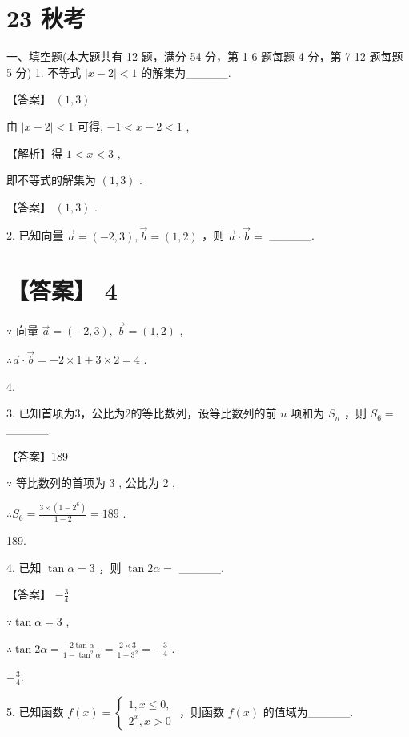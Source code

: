 \documentclass[10pt]{article}
\begin{document}
\section*{23 秋考}

一、填空题(本大题共有 12 题，满分 54 分，第 1-6 题每题 4 分，第 7-12 题每题 5 分) 1. 不等式 \(\left| {x - 2}\right|  < 1\) 的解集为\_\_\_\_\_.

【答案】 \(\left( {1,3}\right)\)

由 \(\left| {x - 2}\right|  < 1\) 可得, \(- 1 < x - 2 < 1\) ,

【解析】得 \(1 < x < 3\) ,

即不等式的解集为 \(\left( {1,3}\right)\) .

【答案】 \(\left( {1,3}\right)\) .

2. 已知向量 \(\overrightarrow{a} = \left( {-2,3}\right) ,\overrightarrow{b} = \left( {1,2}\right)\) ，则 \(\overrightarrow{a} \cdot  \overrightarrow{b} =\) \_\_\_\_\_.

\section*{【答案】 4}

\(\because\) 向量 \(\overrightarrow{a} = \left( {-2,3}\right) ,\;\overrightarrow{b} = \left( {1,2}\right)\) ,

\(\therefore \overrightarrow{a} \cdot  \overrightarrow{b} =  - 2 \times  1 + 3 \times  2 = 4\) .

4.

3. 已知首项为3，公比为2的等比数列，设等比数列的前 \(n\) 项和为 \({S}_{n}\) ，则 \({S}_{6} =\) \_\_\_\_\_.

【答案】189

\(\because\) 等比数列的首项为 3 , 公比为 2 ,

\(\therefore {S}_{6} = \frac{3 \times  \left( {1 - {2}^{6}}\right) }{1 - 2} = {189}\) .

189.

4. 已知 \(\tan \alpha  = 3\) ，则 \(\tan {2\alpha } =\) \_\_\_\_\_.

【答案】 \(- \frac{3}{4}\)

\(\because \tan \alpha  = 3\) ,

\(\therefore \tan {2\alpha } = \frac{2\tan \alpha }{1 - {\tan }^{2}\alpha } = \frac{2 \times  3}{1 - {3}^{2}} =  - \frac{3}{4}\) .

\(- \frac{3}{4}.\)

5. 已知函数 \(f\left( x\right)  = \left\{  \begin{array}{l} 1,x \leq  0, \\  {2}^{x},x > 0 \end{array}\right.\) ，则函数 \(f\left( x\right)\) 的值域为\_\_\_\_\_.
\end{document}
